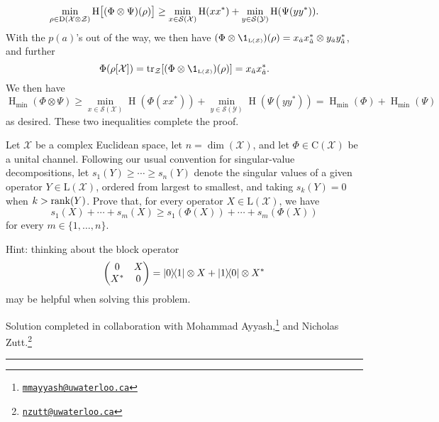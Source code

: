 \documentclass[boxes,pages,color=SeaGreen]{homework}
\newcommand{\collab}[1]{\footnote{\href{mailto:#1}{\texttt{#1}}}}
\renewcommand{\op}[1]{\operatorname{#1}}
\newcommand{\X}{\mathcal{X}}
\newcommand{\Y}{\mathcal{Y}}
\newcommand{\Z}{\mathcal{Z}}
\newcommand{\Lin}{\mathrm{L}}
\newcommand{\Density}{\mathrm{D}}
\newcommand{\Channel}{\mathrm{C}}
\begin{document}
\begin{solution}
\begin{equation*}
    \min_{\rho\in\Density(\X\otimes\Z)}\op{H}\!\qty\big[\qty(\Phi\otimes\Psi)(\rho)] \geq \min_{x\in\mathcal{S}(\X)}\op{H}(x x^*) + \min_{y\in\mathcal{S}(\Y)}\op{H}(\Psi(y y^*)).
  \end{equation*}
  With the $p(a)$'s out of the way, we then have $(\Phi\otimes\1_\mathsmaller{\Lin(\Z)})(\rho) = x_{\hat{a}} x_{\hat{a}}^*\otimes y_{\hat{a}} y_{\hat{a}}^*$, and further
  \begin{equation*}
    \Phi(\rho[\X]) = \tr_\Z\!\qty[(\Phi\otimes\1_\mathsmaller{\Lin(\Z)})(\rho)] = x_{\hat{a}} x_{\hat{a}}^*.
  \end{equation*}
  We then have
  \begin{equation*}
    \op{H}_\text{min}(\Phi\otimes\Psi) \geq \min_{x\in\mathcal{S}(\X)}\op{H}(\Phi(xx^*)) + \min_{y\in\mathcal{S}(\Y)}\op{H}(\Psi(yy^*)) = \op{H}_\text{min}(\Phi) + \op{H}_\text{min}(\Psi)
  \end{equation*}
  as desired.
  These two inequalities complete the proof.
\end{solution}

\begin{problem}
Let $\X$ be a complex Euclidean space, let $n = \dim(\X)$, and let
$\Phi\in\Channel(\X)$ be a unital channel.
Following our usual convention for singular-value decompositions, let
$s_1(Y) \geq \cdots \geq s_n(Y)$ denote the singular values of a given
operator $Y\in\Lin(\X)$, ordered from largest to smallest, and taking
$s_k(Y) = 0$ when $k > \rank(Y)$.
Prove that, for every operator $X\in\Lin(\X)$, we have
\[
  s_1(X) + \cdots + s_m(X) \geq s_1(\Phi(X)) + \cdots + s_m(\Phi(X))
\]
for every $m \in \{1,\ldots,n\}$.

Hint: thinking about the block operator
\[
  \mqty(
  0   & X \\
  X^* & 0
  )
  = \ketbra{0}{1} \otimes X + \ketbra{1}{0} \otimes X^*
\]
may be helpful when solving this problem.
\end{problem}

\noindent Solution completed in collaboration with Mohammad Ayyash,\collab{mmayyash@uwaterloo.ca} and Nicholas Zutt.\collab{nzutt@uwaterloo.ca}

{\noindent\color{SeaGreen!30}\rule{\textwidth}{1.5pt}}

\begin{solution}
\end{solution}
\end{document}

